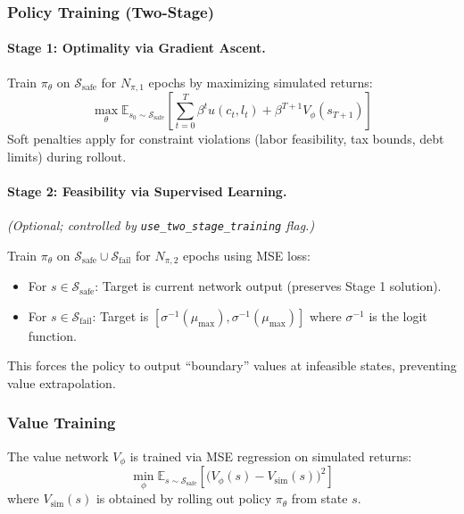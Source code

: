 \subsubsection{Policy Training (Two-Stage)}

\paragraph{Stage 1: Optimality via Gradient Ascent.}
Train $\pi_\theta$ on $\mathcal{S}_{\text{safe}}$ for $N_{\pi,1}$ epochs by maximizing simulated returns:
\begin{equation}
    \max_\theta \mathbb{E}_{s_0 \sim \mathcal{S}_{\text{safe}}} \left[ \sum_{t=0}^{T} \beta^t u(c_t, l_t) + \beta^{T+1} V_\phi(s_{T+1}) \right]
\end{equation}
Soft penalties apply for constraint violations (labor feasibility, tax bounds, debt limits) during rollout.

\paragraph{Stage 2: Feasibility via Supervised Learning.}
\textit{(Optional; controlled by \texttt{use\_two\_stage\_training} flag.)}

Train $\pi_\theta$ on $\mathcal{S}_{\text{safe}} \cup \mathcal{S}_{\text{fail}}$ for $N_{\pi,2}$ epochs using MSE loss:
\begin{itemize}
    \item For $s \in \mathcal{S}_{\text{safe}}$: Target is current network output (preserves Stage 1 solution).
    \item For $s \in \mathcal{S}_{\text{fail}}$: Target is $[\sigma^{-1}(\mu_{\max}), \sigma^{-1}(\mu_{\max})]$ where $\sigma^{-1}$ is the logit function.
\end{itemize}
This forces the policy to output ``boundary'' values at infeasible states, preventing value extrapolation.

\subsubsection{Value Training}
The value network $V_\phi$ is trained via MSE regression on simulated returns:
\begin{equation}
    \min_\phi \mathbb{E}_{s \sim \mathcal{S}_{\text{safe}}} \left[ \bigl(V_\phi(s) - V_{\text{sim}}(s)\bigr)^2 \right]
\end{equation}
where $V_{\text{sim}}(s)$ is obtained by rolling out policy $\pi_\theta$ from state $s$.


